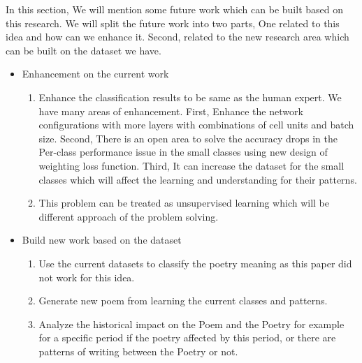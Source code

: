   In this section, We will mention some future work which can be built based on this research. We will split the future work into two parts, One related to this idea and how can we enhance it. Second, related to the new research area which can be built on the dataset we have.

\begin{itemize}
\item Enhancement on the current work
  \begin{enumerate}
  \item Enhance the classification results to be same as the human expert. We have many areas of enhancement. First, Enhance the network configurations with more layers with combinations of cell units and batch size. Second, There is an open area to solve the accuracy drops in the Per-class performance issue in the small classes using new design of weighting loss function. Third, It can increase the dataset for the small classes which will affect the learning and understanding for their patterns.
  \item This problem can be treated as unsupervised learning which will be different approach of the problem solving.
  \end{enumerate}
\item Build new work based on the dataset
  \begin{enumerate}
  \item Use the current datasets to classify the poetry meaning as this paper did not work for this idea.
  \item Generate new poem from learning the current classes and patterns.
    \item Analyze the historical impact on the Poem and the Poetry for example for a specific period if the poetry affected by this period, or there are patterns of writing between the Poetry or not.
\end{enumerate}
  
\end{itemize}



